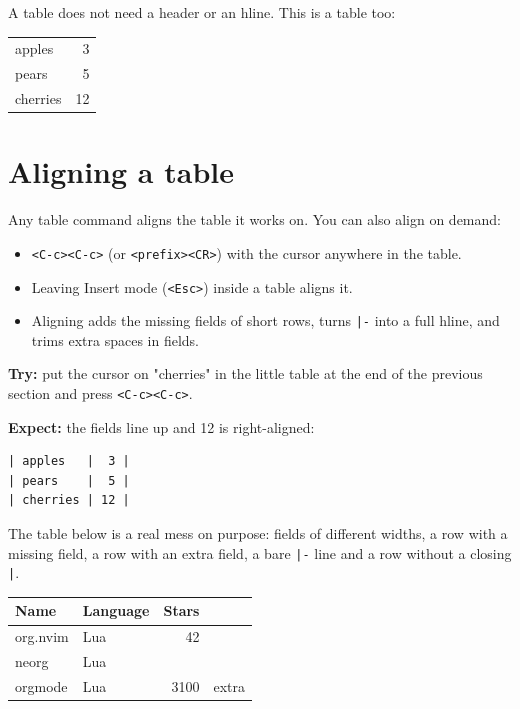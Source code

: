 A table does not need a header or an hline. This is a table too:

\begin{center}
\begin{tabular}{lr}
apples & 3\\
pears & 5\\
cherries & 12\\
\end{tabular}
\end{center}
\section{Aligning a table}
\label{sec:org765f93b}
Any table command aligns the table it works on. You can also align on
demand:

\begin{itemize}
\item \texttt{<C-c><C-c>} (or \texttt{<prefix><CR>}) with the cursor anywhere in the table.
\item Leaving Insert mode (\texttt{<Esc>}) inside a table aligns it.
\item Aligning adds the missing fields of short rows, turns \texttt{|-} into a full
hline, and trims extra spaces in fields.
\end{itemize}

\textbf{Try:} put the cursor on "cherries" in the little table at the end of the
previous section and press \texttt{<C-c><C-c>}.

\textbf{Expect:} the fields line up and 12 is right-aligned:
\begin{verbatim}
| apples   |  3 |
| pears    |  5 |
| cherries | 12 |
\end{verbatim}

The table below is a real mess on purpose: fields of different widths, a
row with a missing field, a row with an extra field, a bare \texttt{|-} line and a
row without a closing \texttt{|}.

\begin{table}[htbp]
\label{tab:org14c171c}
\centering
\begin{tabular}{llr}
Name & Language & Stars\\
\hline
org.nvim & Lua & 42\\
neorg & Lua\\
orgmode & Lua & 3100 & extra\\
\end{tabular}
\end{table}

